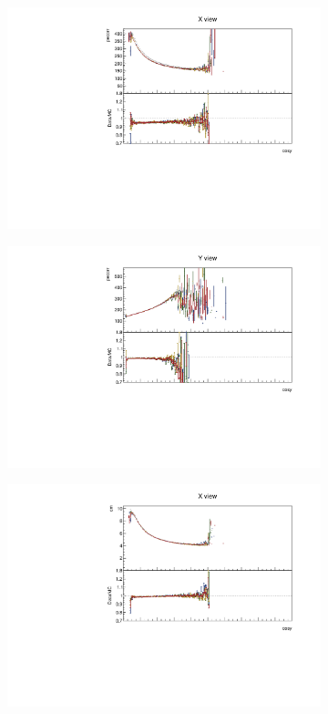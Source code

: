 \documentclass[12pt,a4paper]{article}
\begin{document}
\begin{figure}[!ht]
\begin{subfigure}{0.5\textwidth}
  \end{subfigure}
  \begin{subfigure}{0.5\textwidth}
    \includegraphics[width=\linewidth]{PlotsAngularDistribution/pecorr_cosy_x.pdf}
  \end{subfigure}
  \begin{subfigure}{0.5\textwidth}
    \includegraphics[width=\linewidth]{PlotsAngularDistribution/pecorr_cosy_y.pdf}
  \end{subfigure}
  \begin{subfigure}{0.5\textwidth}
    \includegraphics[width=\linewidth]{PlotsAngularDistribution/cm_cosy_x.pdf}

\end{subfigure}
\end{figure}
\end{document}
